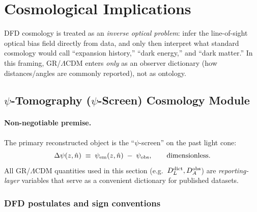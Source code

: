 
\section{Cosmological Implications}\label{sec:cosmology}

DFD cosmology is treated as an \emph{inverse optical problem}: infer the line-of-sight optical bias field directly from data, and only then interpret what standard cosmology would call ``expansion history,'' ``dark energy,'' and ``dark matter.'' In this framing, GR/$\Lambda$CDM enters \emph{only} as an observer dictionary (how distances/angles are commonly reported), not as ontology.

\subsection{$\psi$-Tomography ($\psi$-Screen) Cosmology Module}\label{sec:psi-tomography}

\paragraph{Non-negotiable premise.}
The primary reconstructed object is the ``$\psi$-screen'' on the past light cone:
\begin{equation}
\Delta\psi(z,\hat n)\;\equiv\;\psi_{\rm em}(z,\hat n)\;-\;\psi_{\rm obs},
\qquad \text{dimensionless.}
\label{eq:psitomo-def-dpsi}
\end{equation}
All GR/$\Lambda$CDM quantities used in this section (e.g.\ $D_L^{\rm dict},D_A^{\rm obs}$) are \emph{reporting-layer} variables that serve as a convenient dictionary for published datasets.

\subsubsection{DFD postulates and sign conventions}

